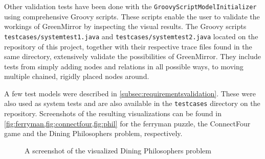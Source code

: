 \documentclass[a4paper]{article}
\begin{document}
Other validation tests have been done with the \lstinline{GroovyScriptModelInitializer} using comprehensive Groovy scripts. These scripts enable the user to validate the workings of GreenMirror by inspecting the visual results. The Groovy scripts \lstinline{testcases/systemtest1.java} and \lstinline{testcases/systemtest2.java} located on the repository of this project, together with their respective trace files found in the same directory, extensively validate the possibilities of GreenMirror. They include tests from simply adding nodes and relations in all possible ways, to moving multiple chained, rigidly placed nodes around.

A few test models were described in \cref{subsec:requirementsvalidation}. These were also used as system tests and are also available in the \lstinline{testcases} directory on the repository. Screenshots of the resulting visualizations can be found in \cref{fig:ferryman,fig:connectfour,fig:phil} for the ferryman puzzle, the ConnectFour game and the Dining Philosophers problem, respectively.

\begin{figure}[ht!]
  \centering
  \caption{A screenshot of the visualized Dining Philosophers problem}
  \label{fig:phil}
\end{figure}
~ %

\end{document}
